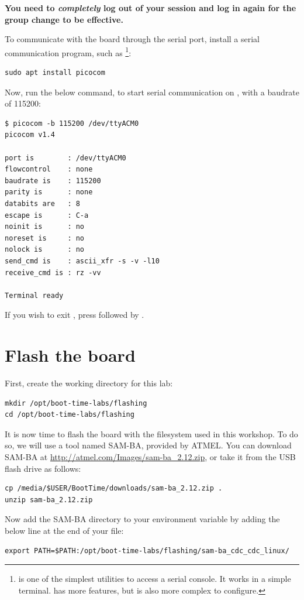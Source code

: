 {\bf You need to {\em completely} log out of your session and log in again
for the group change to be effective.}

To communicate with the board through the serial port, install a
serial communication program, such as \footnote{
 is one of the simplest utilities to access a
serial console. It works in a simple terminal.  has more
features, but is also more complex to configure.}:

\begin{verbatim}
sudo apt install picocom
\end{verbatim}

Now, run the below command, to start serial communication on
, with a baudrate of 115200:

\begin{verbatim}
$ picocom -b 115200 /dev/ttyACM0
picocom v1.4

port is        : /dev/ttyACM0
flowcontrol    : none
baudrate is    : 115200
parity is      : none
databits are   : 8
escape is      : C-a
noinit is      : no
noreset is     : no
nolock is      : no
send_cmd is    : ascii_xfr -s -v -l10
receive_cmd is : rz -vv

Terminal ready
\end{verbatim}

If you wish to exit , press \code{[Ctrl][a]} followed by
\code{[Ctrl][x]}.

\section{Flash the board}

First, create the working directory for this lab:

\begin{verbatim}
mkdir /opt/boot-time-labs/flashing
cd /opt/boot-time-labs/flashing
\end{verbatim}

It is now time to flash the board with the filesystem used in this
workshop. To do so, we will use a tool named SAM-BA, provided by
ATMEL. You can download SAM-BA at
\url{http://atmel.com/Images/sam-ba_2.12.zip}, or take it from the USB
flash drive as follows:

\begin{verbatim}
cp /media/$USER/BootTime/downloads/sam-ba_2.12.zip .
unzip sam-ba_2.12.zip
\end{verbatim}

Now add the SAM-BA directory to your  environment variable
by adding the below line at the end of your  file:
\begin{verbatim}
export PATH=$PATH:/opt/boot-time-labs/flashing/sam-ba_cdc_cdc_linux/
\end{verbatim}

